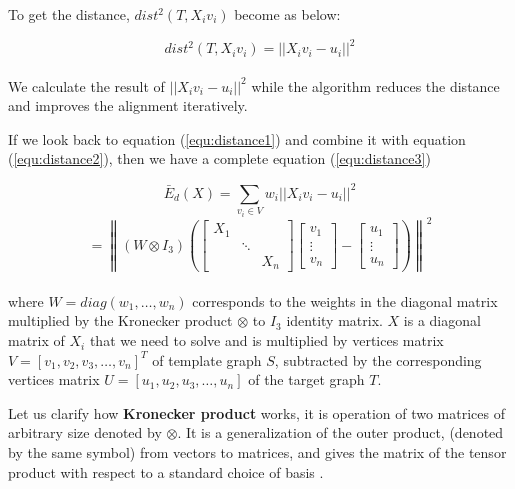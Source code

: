 \documentclass[../structure.tex]{subfiles}
\begin{document}
To get the distance, $dist^2(T,X_{i}v_{i})$ become as below:

\begin{equation}
dist^2(T,X_{i}v_{i}) = ||X_{i}v_{i}-u_{i}||^2
\label{equ:distance2}
\end{equation}\\

We calculate the result of $||X_{i}v_{i}-u_{i}||^2$ while the algorithm reduces the distance and improves the alignment iteratively.

If we look back to equation (\ref{equ:distance1}) and combine it with equation (\ref{equ:distance2}), then we have a complete equation (\ref{equ:distance3})

\begin{equation}
\bar{E}_{d}(X) = \sum_{v_{i}\in V} w_{i}||X_{i}v_{i}-u_{i}||^2
\label{equ:distance3}
\end{equation}
\begin{equation*}
= \left\|(W \otimes I_{3}) \left(
\begin{bmatrix}
X_{1} & & \\
& \ddots & \\
& & X_{n}
\end{bmatrix}
\begin{bmatrix}
v_{1} \\ \vdots \\ v_{n}
\end{bmatrix} -
\begin{bmatrix}
u_{1}\\ \vdots \\ u_{n}
\end{bmatrix}
\right) \right\|^2
\end{equation*}\\

where $W = diag(w_{1},\dots, w_{n})$ corresponds to the weights in the diagonal matrix multiplied by the Kronecker product $\otimes$ to $I_{3}$ identity matrix. $X$ is a diagonal matrix of $X_{i}$ that we need to solve and is multiplied by vertices matrix $V=[v_{1},v_{2},v_{3}, \dots,v_{n}]^T$ of template graph $S$, subtracted by the corresponding vertices matrix $U=[u_{1},u_{2},u_{3}, \dots,u_{n}]$ of the target graph $T$.

Let us clarify how \textbf{Kronecker product} works, it is operation of two matrices of arbitrary size denoted by $\otimes$. It is a generalization of the outer product, (denoted by the same symbol) from vectors to matrices, and gives the matrix of the tensor product with respect to a standard choice of basis \cite{Wikipedia2019}.
\end{document}
